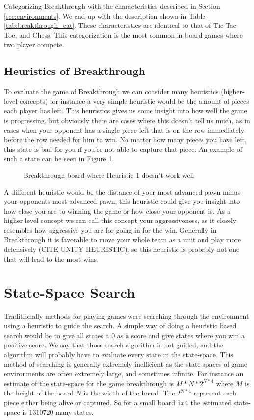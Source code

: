 Categorizing Breakthrough with the characteristics described in Section \ref{sec:environments}. We end up with the description 
shown in Table \ref{tab:breakthrough_cat}. These characteristics are identical to that of Tic-Tac-Toe, and Chess.
This categorization is the most common in board games where two player compete. 

\subsection{Heuristics of Breakthrough}

To evaluate the game of Breakthrough we can consider many heuristics (higher-level concepts) for instance 
a very simple heuristic would be the amount of pieces each player has left. This heuristics gives us some 
insight into how well the game is progressing, but obviously there are cases where this doesn't tell us 
much, as in cases when your opponent has a single piece left that is on the row immediately before the 
row needed for him to win. No matter how many pieces you have left, this state is bad for you if you're not 
able to capture that piece. An example of such a state can be seen in Figure \ref{fig:bt_h1_bad}.

\begin{figure}[]
  \centering
  \caption{Breakthrough board where Heuristic 1 doesn't work well}
  \label{fig:bt_h1_bad}
\end{figure}


A different heuristic would be the distance of your most advanced pawn minus your opponents most 
advanced pawn, this heuristic could give you insight into how close you are to winning the game or 
how close your opponent is. As a higher level concept we can call this concept your aggressiveness, 
as it closely resembles how aggressive you are for going in for the win. Generally in Breakthrough 
it is favorable to move your whole team as a unit and play more defensively (CITE UNITY HEURISTIC), so this heuristic 
is probably not one that will lead to the most wins.

\section{State-Space Search}

Traditionally methods for playing games were searching through the environment using a heuristic to
guide the search. A simple way of doing a heuristic based search would be to give all states a $0$ 
as a score and give states where you win a positive score. We say that those search algorithm 
is not guided, and the algorithm will probably have to evaluate every state in the state-space. 
This method of searching is generally extremely inefficient as the state-spaces of game environments 
are often extremely large, and sometimes infinite. For instance an estimate of the state-space 
for the game breakthrough is $M * N * 2^{N*4}$ where $M$ is the height of the board $N$ is the width 
of the board. The $2^{N*4}$ represent each piece either being alive or captured. So for a small board
$5x4$ the estimated state-space is $1310720$ many states.

